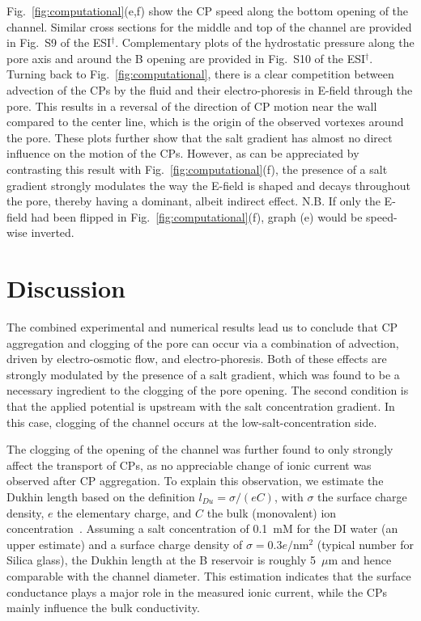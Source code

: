 \documentclass[twoside,twocolumn,9pt]{article}
\begin{document}
Fig.~\ref{fig:computational}(e,f) show the CP speed along the bottom opening of the channel. Similar cross sections for the middle and top of the channel are provided in Fig.~S9 of the ESI$^{\dag}$. Complementary plots of the hydrostatic pressure along the pore axis and around the B opening are provided in Fig.~S10 of the  ESI$^{\dag}$. Turning back to Fig.~\ref{fig:computational}, there is a clear competition between advection of the CPs by the fluid and their electro-phoresis in E-field through the pore. This results in a reversal of the direction of CP motion near the wall compared to the center line, which is the origin of the observed vortexes around the pore. These plots further show that the salt gradient has almost no direct influence on the motion of the CPs. 
However, as can be appreciated by contrasting this result with Fig.~\ref{fig:computational}(f), the presence of a salt gradient strongly modulates the way the E-field is shaped and decays throughout the pore, thereby having a dominant, albeit indirect effect. N.B. If only the E-field had been flipped in Fig.~\ref{fig:computational}(f), graph (e) would be speed-wise inverted.

\section*{Discussion}

The combined experimental and numerical results lead us to conclude that CP aggregation and clogging of the pore can occur via a combination of advection, driven by electro-osmotic flow, and electro-phoresis. Both of these effects are strongly modulated by the presence of a salt gradient, which was found to be a necessary ingredient to the clogging of the pore opening. The second condition is that the applied potential is upstream with the salt concentration gradient. In this case, clogging of the channel occurs at the low-salt-concentration side.

The clogging of the opening of the channel was further found to only strongly affect the transport of CPs, as no appreciable change of ionic current was observed after CP aggregation. To explain this observation, we estimate the Dukhin length based on the definition $l_{Du} = \sigma/(e C)$, with $\sigma$ the surface charge density, $e$ the elementary charge, and $C$ the bulk (monovalent) ion concentration~\cite{bocquet2010nanofluidics}.
Assuming a salt concentration of 0.1~mM for the DI water (an upper estimate) and a surface charge density of $\sigma = 0.3 e /\mathrm{nm}^2$ (typical number for Silica glass), the Dukhin length at the B reservoir is roughly 5~$\mu$m and hence comparable with the channel diameter. This estimation indicates that the surface conductance plays a major role in the measured ionic current, while the CPs mainly influence the bulk conductivity.
\end{document}
